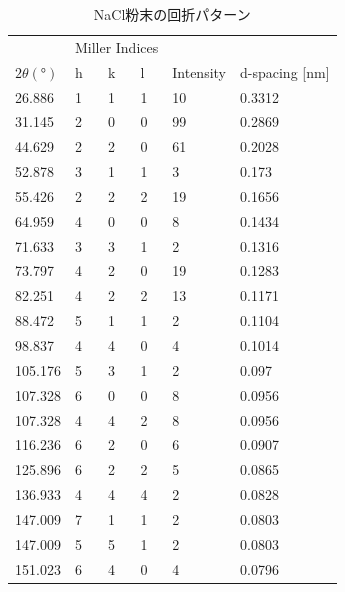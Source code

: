 \documentclass[11pt,a4j,uplatex]{jsarticle}
\begin{document}
\begin{table}[htbp]
 \begin{center}
  \caption{NaCl粉末の回折パターン\cite{powder}}
  \begin{tabular}{|l|l|l|l|l|l|}  \hline
           & \multicolumn{3}{l}{Miller Indices} &   &                                \\
   $2\theta(°)$  & h                                  & k & l & Intensity & d-spacing [nm] \\  \hline \hline
   26.886  & 1                                  & 1 & 1 & 10        & 0.3312         \\
   31.145  & 2                                  & 0 & 0 & 99        & 0.2869         \\
   44.629  & 2                                  & 2 & 0 & 61        & 0.2028         \\
   52.878  & 3                                  & 1 & 1 & 3         & 0.173          \\
   55.426  & 2                                  & 2 & 2 & 19        & 0.1656         \\
   64.959  & 4                                  & 0 & 0 & 8         & 0.1434         \\
   71.633  & 3                                  & 3 & 1 & 2         & 0.1316         \\
   73.797  & 4                                  & 2 & 0 & 19        & 0.1283         \\
   82.251  & 4                                  & 2 & 2 & 13        & 0.1171         \\
   88.472  & 5                                  & 1 & 1 & 2         & 0.1104         \\
   98.837  & 4                                  & 4 & 0 & 4         & 0.1014         \\
   105.176 & 5                                  & 3 & 1 & 2         & 0.097          \\
   107.328 & 6                                  & 0 & 0 & 8         & 0.0956         \\
   107.328 & 4                                  & 4 & 2 & 8         & 0.0956         \\
   116.236 & 6                                  & 2 & 0 & 6         & 0.0907         \\
   125.896 & 6                                  & 2 & 2 & 5         & 0.0865         \\
   136.933 & 4                                  & 4 & 4 & 2         & 0.0828         \\
   147.009 & 7                                  & 1 & 1 & 2         & 0.0803         \\
   147.009 & 5                                  & 5 & 1 & 2         & 0.0803         \\
   151.023 & 6                                  & 4 & 0 & 4         & 0.0796         \\  \hline
  \end{tabular}
  \label{***label***}
 \end{center}
\end{table}
\end{document}
